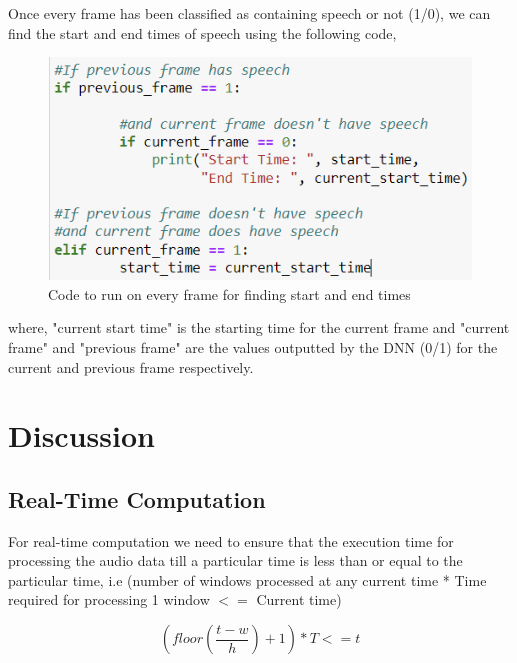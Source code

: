 \documentclass[%
 reprint,
 amsmath,amssymb,
 aps,
]{revtex4-2}
\begin{document}
\vspace{-8mm}

Once every frame has been classified as containing speech or not (1/0), we can find the start and end times
of speech using the following code,

\begin{figure}[h]
    \includegraphics[scale=0.8]{StartEndCode.png}
    \caption{Code to run on every frame for finding start and end times}
\end{figure}

\vspace{-1mm}

where, "current start time" is the starting time for the current frame and "current frame" and "previous frame"
are the values outputted by the DNN (0/1) for the current and previous frame respectively.

\section{Discussion}
\vspace{-3mm}
\subsection{Real-Time Computation}
\vspace{-5mm}
For real-time computation we need to ensure that the execution time for processing the audio data till a
particular time is less than or equal to the particular time, i.e (number of windows processed at any current
time * Time required for processing 1 window $<=$ Current time)


\begin{equation}
    ( floor(\frac{t-w}{h}) + 1 ) * T <= t
\end{equation}
\end{document}
